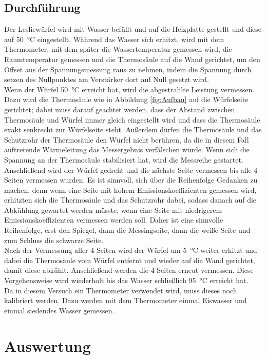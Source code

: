 \documentclass[12pt,a4paper]{article}
\begin{document}
\subsection{Durchführung}
Der Lesliewürfel wird mit Wasser befüllt und auf die Heizplatte gestellt und diese auf \SI{50}{\celsius} eingestellt. Während das Wasser sich erhitzt, wird mit dem Thermometer, mit dem später die Wassertemperatur gemessen wird, die Raumtemperatur gemessen und die Thermosäule auf die Wand gerichtet, um den Offset aus der Spannungsmessung raus zu nehmen, indem die Spannung durch setzen des Nullpunktes am Verstärker dort auf Null gesetzt wird. \\
Wenn der Würfel \SI{50}{\celsius} erreicht hat, wird die abgestrahlte Leistung vermessen. Dazu wird die Thermosäule wie in Abbildung \ref{fig:Aufbau} auf die Würfelseite gerichtet; dabei muss darauf geachtet werden, dass der Abstand zwischen Thermosäule und Würfel immer gleich eingestellt wird und dass die Thermosäule exakt senkrecht zur Würfelseite steht. Außerdem dürfen die Thermosäule und das Schutzrohr der Thermosäule den Würfel nicht berühren, da die in diesem Fall auftretende Wärmeleitung das Messergebnis verfälschen würde. Wenn sich die Spannung an der Thermosäule stabilisiert hat, wird die Messreihe gestartet. Anschließend wird der Würfel gedreht und die nächste Seite vermessen bis alle 4 Seiten vermessen wurden. Es ist sinnvoll, sich über die Reihenfolge Gedanken zu machen, denn wenn eine Seite mit hohem Emissionskoeffizienten gemessen wird, erhitzten sich die Thermosäule und das Schutzrohr dabei, sodass danach auf die Abkühlung gewartet werden müsste, wenn eine Seite mit niedrigerem Emissionskoeffizienten vermessen werden soll. Daher ist eine sinnvolle Reihenfolge, erst den Spiegel, dann die Messingseite, dann die weiße Seite und zum Schluss die schwarze Seite.\\
Nach der Vermessung aller 4 Seiten wird der Würfel um  \SI{5}{\celsius} weiter erhitzt und dabei die Thermosäule vom Würfel entfernt und wieder auf die Wand gerichtet, damit diese abkühlt. Anschließend werden die 4 Seiten erneut vermessen. Diese Vorgehensweise wird wiederholt bis das Wasser schließlich \SI{95}{\celsius} erreicht hat.\\
Da in diesem Versuch ein Thermometer verwendet wird, muss dieses noch kalibriert werden. Dazu werden mit dem Thermometer einmal Eiswasser und einmal siedendes Wasser gemessen.

\section{Auswertung}
\end{document}
